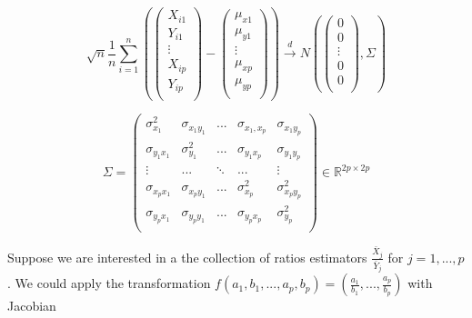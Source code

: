 \documentclass{article}
\theoremstyle{definition}
\begin{document}
\begin{equation*} \sqrt{n} \frac{1}{n}\sum_{i=1}^{n}
    \left(\left(\begin{array}{c}
        X_{i1}  \\
        Y_{i1}  \\ 
        \vdots \\ 
        X_{ip}\\
        Y_{ip}\\
    \end{array}\right) - \left(\begin{array}{c}
        \mu_{x1}  \\
        \mu_{y1}  \\ 
        \vdots \\ 
        \mu_{xp}  \\
        \mu_{yp}  \\ 
    \end{array}\right)\right) \xrightarrow{d}
    N\left(\left(\begin{array}{c}
        0  \\
        0  \\
        \vdots \\
        0  \\
        0  \\
    \end{array}\right),\Sigma \right)
\end{equation*}

\begin{equation*}
    \Sigma = \left(\begin{array}{ccccc}
        \sigma_{x_1}^2  & \sigma_{x_1y_1}  & ... & \sigma_{x_1,x_p} & \sigma_{x_1y_p} \\
        \sigma_{y_1x_1} & \sigma_{y_1}^2   &... & \sigma_{y_1x_p} &\sigma_{y_1y_p} \\
        \vdots   & ... & \ddots  & ... & \vdots  \\
        \sigma_{x_px_1} & \sigma_{x_py_1} & ... & \sigma_{x_p}^2  & \sigma_{x_py_p}^2 \\
        \sigma_{y_px_1} & \sigma_{y_py_1} & ... & \sigma_{y_px_p} & \sigma_{y_p}^2 \\
    \end{array}\right) \in \mathbb{R}^{2p\times 2p}
\end{equation*}

Suppose we are interested in a the collection of ratios estimators $\frac{\bar{X}_{j}}{\bar{Y}_j}$ for $j=1,...,p$. We could apply the transformation $f(a_1,b_1,...,a_p,b_p) = \left(\frac{a_1}{b_1},...,\frac{a_p}{b_p}\right)$ with Jacobian
\end{document}
